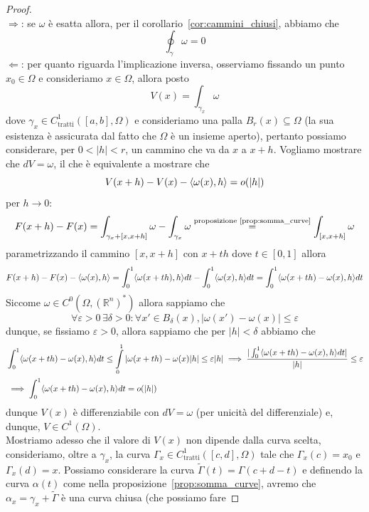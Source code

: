 \begin{proof} \hspace{1cm} \\
$\boxed{\Rightarrow}$: se $\omega$ è esatta allora, per il corollario~\ref{cor:cammini_chiusi}, abbiamo che
$$
\oint_\gamma \omega = 0
$$
$\boxed{\Leftarrow}$: per quanto riguarda l'implicazione inversa, osserviamo fissando un punto $x_0 \in \Omega$ e consideriamo $x \in \Omega$, allora posto
$$
V(x) = \int_{\gamma_x} \omega
$$
dove $\gamma_x \in C^1_\text{tratti}([a, b], \Omega)$ e consideriamo una palla $B_r(x) \subseteq \Omega$ (la sua esistenza è assicurata dal fatto che $\Omega$ è un insieme aperto), pertanto possiamo considerare, per $0 < |h| < r$, un cammino che va da $x$ a $x+h$. Vogliamo mostrare che $dV =\omega$, il che è equivalente a mostrare che $$V(x+h) - V(x) - \langle \omega(x), h \rangle = o(|h|)$$ per $h \to 0$:
$$
F(x+h) - F(x) = \int_{\gamma_x + [x, x+h]} \omega - \int_{\gamma_x} \omega \stackrel{\text{proposizione~\ref{prop:somma_curve}}}{=} \int_{[x, x+h]} \omega
$$
parametrizzando il cammino $[x, x+h]$ con $x + th$ dove $t \in [0,1]$ allora
$$
F(x+h)-F(x) - \langle \omega(x), h \rangle = \int_0^1 \langle \omega(x + th), h \rangle dt - \int_0^1 \langle \omega(x), h \rangle dt = \int_0^1 \langle \omega(x + th) - \omega(x), h \rangle dt
$$
Siccome $\omega \in C^0(\Omega, (\mathbb{R}^n)^*)$ allora sappiamo che
$$
\forall \varepsilon > 0 \, \exists \delta > 0: \forall x' \in B_\delta(x), |\omega(x') - \omega(x)| \leq \varepsilon
$$
dunque, se fissiamo $\varepsilon > 0$, allora sappiamo che per $|h| < \delta$ abbiamo che
\begin{align*}
&\int_0^1 \langle \omega(x + th) - \omega(x), h \rangle dt \leq \int\limits_0^1 |\omega(x + th) - \omega(x)|h| \leq \varepsilon |h| \implies \frac{|\int_0^1 \langle \omega(x + th) - \omega(x), h \rangle dt|}{|h|} \leq \varepsilon \\
&\implies \int_0^1 \langle \omega(x + th) - \omega(x), h \rangle dt = o(|h|) 
\end{align*}
dunque $V(x)$ è differenziabile con $dV = \omega$ (per unicità del differenziale) e, dunque, $V \in C^1(\Omega)$. \\
Mostriamo adesso che il valore di $V(x)$ non dipende dalla curva scelta, consideriamo, oltre a $\gamma_x$, la curva $\Gamma_x \in C^1_\text{tratti}([c, d], \Omega)$ tale che $\Gamma_x(c) = x_0$ e $\Gamma_x(d) = x$. Possiamo considerare la curva $\tilde{\Gamma}(t) = \Gamma(c + d - t)$ e definendo la curva $\alpha(t)$ come nella proposizione~\ref{prop:somma_curve}, avremo che $\alpha_x = \gamma_x + \tilde{\Gamma}$ è una curva chiusa (che possiamo fare

\end{proof}

